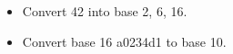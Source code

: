 \begin{itemize}

\item

  Convert 42 into base 2, 6, 16.

\item

  Convert base 16 a0234d1 to base 10.

\end{itemize}

